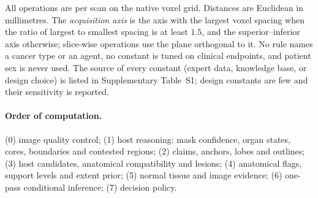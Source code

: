\documentclass[fleqn,10pt]{olplainarticle}
\begin{document}
All operations are per scan on the native voxel grid. Distances are Euclidean in millimetres. The \emph{acquisition axis}
is the axis with the largest voxel spacing when the ratio of largest to smallest spacing is at least $1.5$, and the
superior--inferior axis otherwise; slice-wise operations use the plane orthogonal to it. No rule names a cancer type or an
agent, no constant is tuned on clinical endpoints, and patient sex is never used. The source of every constant (expert
data, knowledge base, or design choice) is listed in Supplementary Table~S1; design constants are few and their
sensitivity is reported.

\paragraph{Order of computation.} (0) image quality control; (1) host reasoning: mask confidence, organ states, cores,
boundaries and contested regions; (2) claims, anchors, lobes and outlines; (3) host candidates, anatomical compatibility
and lesions; (4) anatomical flags, support levels and extent prior; (5) normal tissue and image evidence; (6) one-pass
conditional inference; (7) decision policy.

\end{document}
